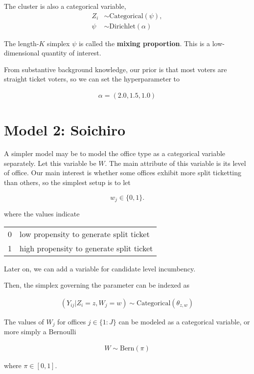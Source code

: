 \documentclass[12pt,letterpaper]{article}
\begin{document}
The cluster is also a categorical variable, \begin{align*}
Z_{i} &\sim \text{Categorical}(\psi),\\
\psi &\sim \text{Dirichlet}(\alpha)
\end{align*}

The length-\(K\) simplex \(\psi\) is called the \textbf{mixing
proportion}. This is a low-dimensional quantity of interest.

From substantive background knowledge, our prior is that most voters are
straight ticket voters, so we can set the hyperparameter to

\begin{align*}
\alpha = (2.0, 1.5, 1.0)
\end{align*}

\section{Model 2: Soichiro}

A simpler model may be to model the office type as a categorical
variable separately. Let this variable be \(W\). The main attribute of
this variable is its level of office. Our main interest is whether some
offices exhibit more split ticketting than others, so the simplest setup
is to let

\[w_{j} \in \{0, 1\}.\]

where the values indicate

\begin{table}[!h]
\centering
\begin{tabular}{ll}\toprule
0 & low propensity to generate split ticket\\
1 & high propensity to generate split ticket\\\bottomrule
\end{tabular}
\end{table}

Later on, we can add a variable for candidate level incumbency.

Then, the simplex governing the parameter can be indexed as

\begin{align*}
(Y_{ij} | Z_i = z, W_j = w) \sim \text{Categorical}(\theta_{z, w})
\end{align*}

The values of \(W_j\) for offices \(j \in \{1:J\}\) can be modeled as a
categorical variable, or more simply a Bernoulli

\begin{align*}
W \sim  \text{Bern}(\pi)
\end{align*}

where \(\pi \in [0, 1].\)
\end{document}
